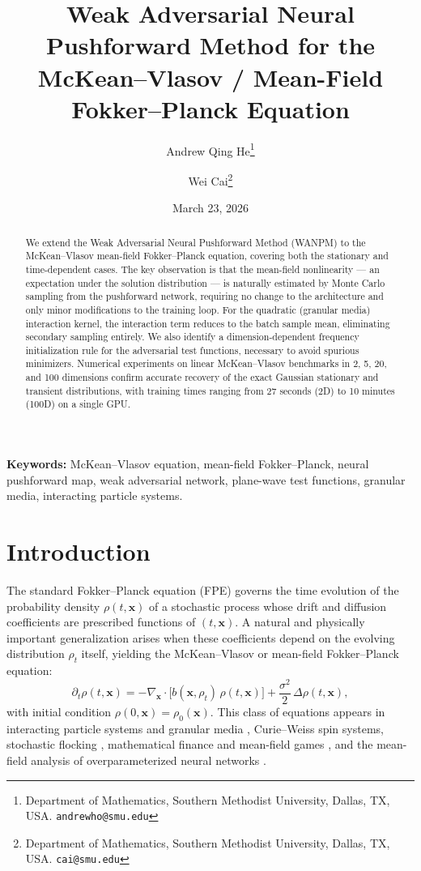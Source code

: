 \documentclass[12pt]{article}
\title{\textbf{Weak Adversarial Neural Pushforward Method for the\\ McKean--Vlasov / Mean-Field Fokker--Planck Equation}}
\author{Andrew Qing He\thanks{Department of Mathematics, Southern Methodist University,
Dallas, TX, USA. \texttt{andrewho@smu.edu}}
\and
Wei Cai\thanks{Department of Mathematics, Southern Methodist University,
Dallas, TX, USA. \texttt{cai@smu.edu}}}
\date{March 23, 2026}
\newcommand{\bx}{\mathbf{x}}
\theoremstyle{plain}
\begin{document}
\maketitle

\begin{abstract}
We extend the Weak Adversarial Neural Pushforward Method (WANPM) \cite{HeCai2025} to
the McKean--Vlasov mean-field Fokker--Planck equation, covering both the stationary and
time-dependent cases. The key observation is that the mean-field nonlinearity --- an
expectation under the solution distribution --- is naturally estimated by Monte Carlo
sampling from the pushforward network, requiring no change to the architecture and only
minor modifications to the training loop. For the quadratic (granular media) interaction
kernel, the interaction term reduces to the batch sample mean, eliminating secondary
sampling entirely. We also identify a dimension-dependent frequency initialization rule
for the adversarial test functions, necessary to avoid spurious minimizers. Numerical experiments on linear McKean--Vlasov benchmarks in 2,
5, 20, and 100 dimensions confirm accurate recovery of the exact Gaussian stationary
and transient distributions, with training times ranging from 27 seconds (2D) to 10
minutes (100D) on a single GPU.
\end{abstract}

\textbf{Keywords:} McKean--Vlasov equation, mean-field Fokker--Planck, neural pushforward
map, weak adversarial network, plane-wave test functions, granular media, interacting
particle systems.

\tableofcontents

\section{Introduction}

The standard Fokker--Planck equation (FPE) governs the time evolution of the probability
density $\rho(t,\bx)$ of a stochastic process whose drift and diffusion coefficients are
prescribed functions of $(t,\bx)$. A natural and physically important generalization arises
when these coefficients depend on the evolving distribution $\rho_t$ itself, yielding the
McKean--Vlasov or mean-field Fokker--Planck equation:
\begin{equation}
  \partial_t \rho(t,\bx)
  = -\nabla_{\bx} \cdot \bigl[b(\bx,\rho_t)\,\rho(t,\bx)\bigr]
    + \frac{\sigma^2}{2}\,\Delta\rho(t,\bx),
  \label{eq:MKV}
\end{equation}
with initial condition $\rho(0,\bx)=\rho_0(\bx)$. This class of equations appears in
interacting particle systems and granular media \cite{McCann1997}, Curie--Weiss spin
systems, stochastic flocking \cite{HaTadmor2008}, mathematical finance and mean-field
games \cite{CarmonaDelarue2018}, and the mean-field analysis of overparameterized
neural networks \cite{MeiMontanariNguyen2018}.
\end{document}
